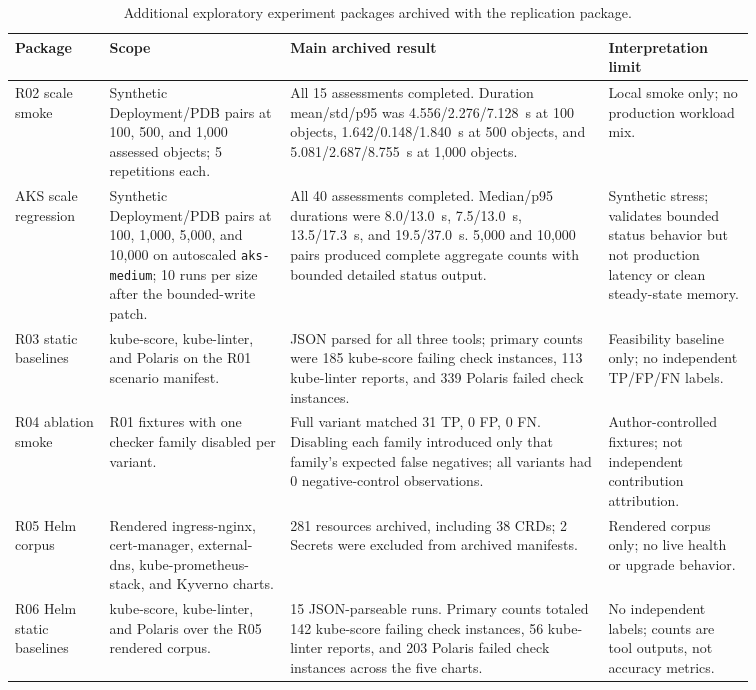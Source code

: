 \documentclass[10pt,journal]{IEEEtran}
\newcommand{\code}[1]{\texttt{#1}}
\begin{document}
\begin{table}[t]
  \centering
  \caption{Additional exploratory experiment packages archived with the replication package.}
  \label{tab:additional-packages}
  \scriptsize
  \begin{tabular}{p{0.11\linewidth}p{0.21\linewidth}p{0.37\linewidth}p{0.17\linewidth}}
    \toprule
    Package & Scope & Main archived result & Interpretation limit \\
    \midrule
    R02 scale smoke & Synthetic Deployment/PDB pairs at 100, 500, and 1,000 assessed objects; 5 repetitions each. & All 15 assessments completed. Duration mean/std/p95 was 4.556/2.276/7.128~s at 100 objects, 1.642/0.148/1.840~s at 500 objects, and 5.081/2.687/8.755~s at 1,000 objects. & Local smoke only; no production workload mix. \\
    AKS scale regression & Synthetic Deployment/PDB pairs at 100, 1,000, 5,000, and 10,000 on autoscaled \code{aks-medium}; 10 runs per size after the bounded-write patch. & All 40 assessments completed. Median/p95 durations were 8.0/13.0~s, 7.5/13.0~s, 13.5/17.3~s, and 19.5/37.0~s. 5,000 and 10,000 pairs produced complete aggregate counts with bounded detailed status output. & Synthetic stress; validates bounded status behavior but not production latency or clean steady-state memory. \\
    R03 static baselines & kube-score, kube-linter, and Polaris on the R01 scenario manifest. & JSON parsed for all three tools; primary counts were 185 kube-score failing check instances, 113 kube-linter reports, and 339 Polaris failed check instances. & Feasibility baseline only; no independent TP/FP/FN labels. \\
    R04 ablation smoke & R01 fixtures with one checker family disabled per variant. & Full variant matched 31 TP, 0 FP, 0 FN. Disabling each family introduced only that family's expected false negatives; all variants had 0 negative-control observations. & Author-controlled fixtures; not independent contribution attribution. \\
    R05 Helm corpus & Rendered ingress-nginx, cert-manager, external-dns, kube-prometheus-stack, and Kyverno charts. & 281 resources archived, including 38 CRDs; 2 Secrets were excluded from archived manifests. & Rendered corpus only; no live health or upgrade behavior. \\
    R06 Helm static baselines & kube-score, kube-linter, and Polaris over the R05 rendered corpus. & 15 JSON-parseable runs. Primary counts totaled 142 kube-score failing check instances, 56 kube-linter reports, and 203 Polaris failed check instances across the five charts. & No independent labels; counts are tool outputs, not accuracy metrics. \\

\end{tabular}
\end{table}
\end{document}
